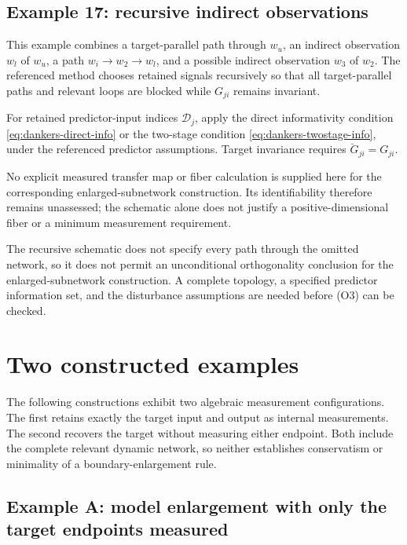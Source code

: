 \documentclass[11pt,a4paper]{article}
\newcommand{\Dset}{\mathcal D}
\begin{document}
\subsection{Example 17: recursive indirect observations}

This example combines a target-parallel path through $w_u$, an indirect observation $w_l$ of $w_u$, a path $w_i\to w_2\to w_l$, and a possible indirect observation $w_3$ of $w_2$.  The referenced method chooses retained signals recursively so that all target-parallel paths and relevant loops are blocked while $G_{ji}$ remains invariant.

For retained predictor-input indices $\Dset_j$, apply the direct informativity condition \eqref{eq:dankers-direct-info} or the two-stage condition \eqref{eq:dankers-twostage-info}, under the referenced predictor assumptions.  Target invariance requires $\breve G_{ji}=G_{ji}$.

No explicit measured transfer map or fiber calculation is supplied here for the corresponding enlarged-subnetwork construction.  Its identifiability therefore remains unassessed; the schematic alone does not justify a positive-dimensional fiber or a minimum measurement requirement.

The recursive schematic does not specify every path through the omitted network, so it does not permit an unconditional orthogonality conclusion for the enlarged-subnetwork construction.  A complete topology, a specified predictor information set, and the disturbance assumptions are needed before (O3) can be checked.

\section{Two constructed examples}

The following constructions exhibit two algebraic measurement configurations.  The first retains exactly the target input and output as internal measurements.  The second recovers the target without measuring either endpoint.  Both include the complete relevant dynamic network, so neither establishes conservatism or minimality of a boundary-enlargement rule.

\subsection{Example A: model enlargement with only the target endpoints measured}
\end{document}
